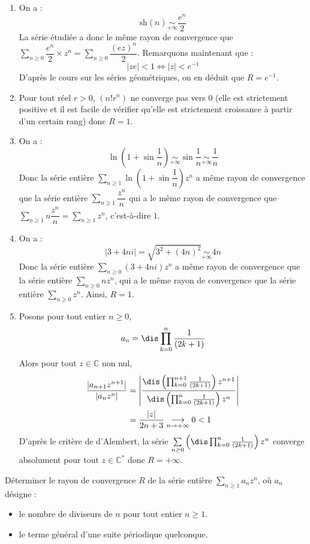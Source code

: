 \documentclass[a4paper,10pt]{report}
\newcommand{\Sum}[2]{\ensuremath{\textstyle{\sum\limits_{#1}^{#2}}}}
\begin{document}
\begin{enumerate}
\item  On a :
$$\textrm{sh}(n) \underset{+ \infty}{\sim} \dfrac{e^n}{2}$$
La série étudiée a donc le même rayon de convergence que $\Sum{n \geq 0}{}  \dfrac{e^n}{2} \times z^n = \Sum{n \geq 0}{}  \dfrac{(ez)^n}{2}$. Remarquons maintenant que :
$$ \vert ze \vert < 1 \Longleftrightarrow \vert z \vert < e^{-1}$$
D'après le cours sur les séries géométriques, on en déduit que $R=e^{-1}$.
\item Pour tout réel $r>0$, $(n!r^n)$ ne converge pas vers $0$ (elle est strictement positive et il est facile de vérifier qu'elle est strictement croissance à partir d'un certain rang) donc $R=1$.
\item On a :
\[
\ln\left(1+\sin\dfrac{1}{n}\right)\underset{+\infty}{\sim}\sin\dfrac{1}{n}\underset{+\infty}{\sim}\dfrac{1}{n}
\]
Donc la série entière $\Sum{n \geq 1}{}\ln\left(1+\sin\dfrac{1}{n}\right)z^n$ a même rayon de convergence que la série entière $\Sum{n \geq 1}{} \dfrac{z^n}{n}$ qui a le même rayon de convergence que $\Sum{n \geq 1}{} n\dfrac{z^n}{n} = \Sum{n \geq 1}{} z^n$, c'est-à-dire $1$.
\item On a :
\[
\vert 3+4ni\vert=\sqrt{3^2+(4n)^2}\underset{+\infty}{\sim}4n
\]
Donc la série entière $\Sum{n \geq 0}{} (3+4ni)z^n$ a même rayon de convergence que la série entière $\Sum{n \geq 0}{} nz^n$, qui a le même rayon de convergence que la série entière $\Sum{n \geq 0}{} z^n$. Ainsi, $R=1$.
\item Posons pour tout entier $n \geq 0$,
$$a_n = \dis \prod_{k=0}^n\dfrac{1}{(2k+1)} $$
Alors pour tout $z \in \mathbb{C}$ non nul, 
\begin{align*}
\dfrac{\vert a_{n+1} z^{n+1} \vert }{\vert a_n z^n \vert} & =\left\vert\dfrac{\dis \left(\prod_{k=0}^{n+1}\frac{1}{(2k+1)}\right)z^{n+1}}{\dis \left(\prod_{k=0}^n\frac{1}{(2k+1)}\right)z^n}\right\vert \\
& =\dfrac{\vert z\vert }{2n+3}\underset{n \rightarrow +\infty}{\longrightarrow}0<1
\end{align*}
D'après le critère de d'Alembert, la série $\Sum{n \geq 0}{} \left(\dis \prod_{k=0}^n\frac{1}{(2k+1)}\right)z^n$ converge absolument pour tout $z\in\mathbb{C}^*$ donc $R=+\infty$. 
\end{enumerate}

\begin{Exa} Déterminer le rayon de convergence $R$ de la série entière $\Sum{n\geq 1}{} a_n z^n$, où $a_n$ désigne : 
\begin{itemize}
\item le nombre de diviseurs de $n$ pour tout entier $n\geq 1$.
\item le terme général d'une suite périodique quelconque. 
\end{itemize}
\end{Exa}
\end{document}
